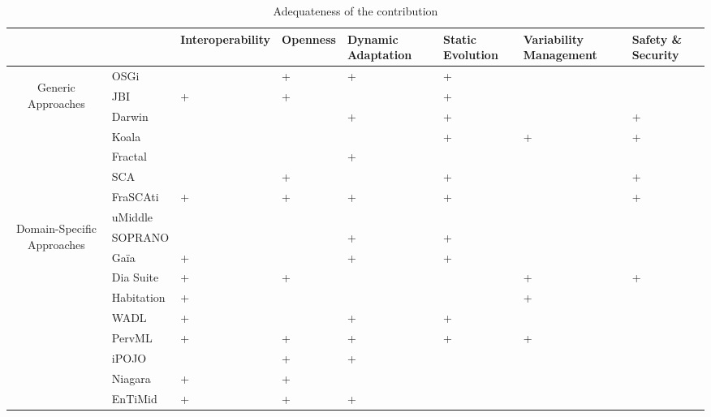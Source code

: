 \begin{table}[h!]
\begin{tabular}{cm{}|| >{\centering\arraybackslash}m{}| >{\centering\arraybackslash}m{}| >{\centering\arraybackslash}m{}| >{\centering\arraybackslash}m{}| >{\centering}m{}| >{\centering\arraybackslash}m{}|}
 & & {\tiny Interoperability} & {\tiny Openness} & {\tiny Dynamic Adaptation} & {\tiny Static Evolution} & {\tiny Variability Management} & {\tiny Safety \& Security}\\
 \hline\hline
 \multirow{7}{8mm}{\begin{sideways}\parbox{25mm}{\centering Generic Approaches}\end{sideways}}
 &{\small OSGi} 		&  & + & + & + &  &  \\ 
 &{\small JBI} 			& + & + &  & + &  &  \\
 \cline{2-8}%
 &{\small Darwin} 		&  &  & + & + &   & + \\ 
 &{\small Koala} 		&  &  &   & + & + & + \\
 &{\small Fractal} 		&  &  & + &   &   &  \\
 \cline{2-8}%
 &{\small SCA} 			&   & + &  & + &  & +\\
 &{\small FraSCAti}     & + & + & + & + &  & + \\
 \hline\hline
 \multirow{9}{8mm}{\begin{sideways}\parbox{30mm}{\centering  Domain-Specific Approaches}\end{sideways}} 
 &{\small uMiddle} 		&  &  &  &  &  &  \\
 &{\small SOPRANO} 		&  &  & + & + &  &  \\
 &{\small Ga\"ia} 		& + &  & + & + &  &  \\
 &{\small Dia Suite} 	& + & + &  &  & + & + \\
 &{\small Habitation} 	& + &  &  &  & + &  \\
 &{\small WADL} 		& + &  & + & + &  &  \\
 &{\small PervML} 		& + & + & + & + & + &  \\
 &{\small iPOJO} 		&  & + & + &  &  &  \\
 &{\small Niagara} 		& + & + &  &  &  &  \\
 \cline{2-8}
 &{\small EnTiMid} 		& + & + & + &  &  &  \\
 \hline
\end{tabular}
\caption{Adequateness of the contribution}
\label{tab:adequatness}
\end{table}

